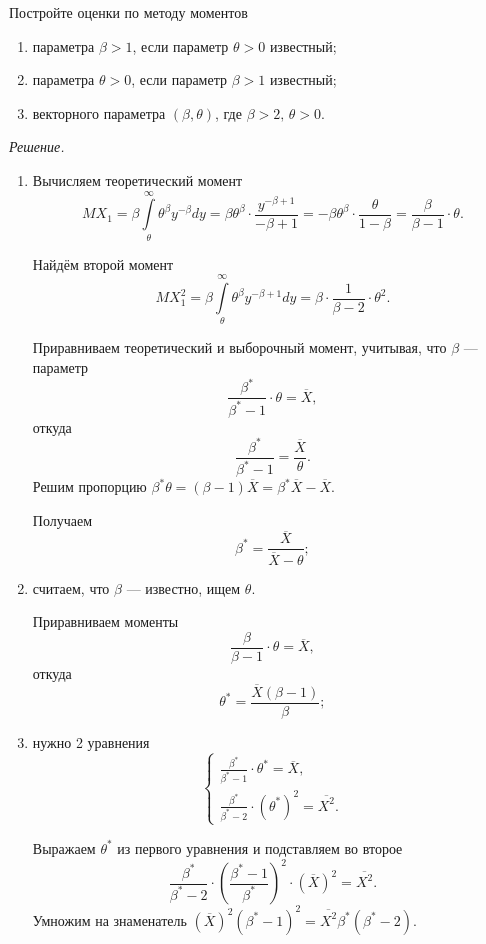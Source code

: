 Постройте оценки по методу моментов
\begin{enumerate}[label=\alph*)]
  \item параметра $ \beta > 1$, если параметр $ \theta > 0$ известный;
  \item параметра $ \theta > 0$, если параметр $ \beta > 1$ известный;
  \item векторного параметра $ \left( \beta, \theta \right) $, где $ \beta > 2, \, \theta > 0$.
\end{enumerate}

\textit{Решение.}
\begin{enumerate}[label=\alph*)]
  \item Вычисляем теоретический момент
  $$MX_1 =
    \beta \int \limits_{ \theta }^{ \infty } \theta^{ \beta } y^{- \beta } dy =
    \beta \theta^{ \beta } \cdot \frac{y^{- \beta + 1}}{- \beta + 1} =
    - \beta \theta^{ \beta } \cdot \frac{ \theta }{1 - \beta } =
    \frac{ \beta }{ \beta - 1} \cdot \theta.$$

  Найдём второй момент
  $$MX_1^2 =
    \beta \int \limits_{ \theta }^{ \infty } \theta^{ \beta } y^{- \beta + 1} dy =
    \beta \cdot \frac{1}{ \beta - 2} \cdot \theta^2.$$

  Приравниваем теоретический и выборочный момент, учитывая, что $ \beta $ --- параметр
  $$ \frac{ \beta^*}{ \beta^* - 1} \cdot \theta =
    \overline{X},$$
  откуда
  $$ \frac{ \beta^*}{ \beta^* - 1} =
    \frac{ \overline{X}}{ \theta }.$$
  Решим пропорцию
  $ \beta^* \theta =
    \left( \beta - 1 \right) \overline{X} =
    \beta^* \overline{X} - \overline{X}$.

  Получаем
  $$ \beta^* =
    \frac{ \overline{X}}{ \overline{X} - \theta };$$
  \item считаем, что $ \beta $ --- известно, ищем $ \theta $.

  Приравниваем моменты
  $$ \frac{ \beta }{ \beta - 1} \cdot \theta =
    \overline{X},$$
  откуда
  $$ \theta^* =
    \frac{ \overline{X} \left( \beta - 1 \right) }{ \beta };$$
  \item нужно 2 уравнения
  $$ \begin{cases}
      \frac{ \beta^*}{ \beta^* - 1} \cdot \theta^* = \overline{X}, \\
      \frac{ \beta^*}{ \beta^* - 2} \cdot \left( \theta^* \right)^2 = \overline{X^2}.
    \end{cases}$$

  Выражаем $ \theta^*$ из первого уравнения и подставляем во второе
  $$ \frac{ \beta^*}{ \beta^* - 2} \cdot
    \left( \frac{ \beta^* - 1}{ \beta^*} \right)^2 \cdot
    \left( \overline{X} \right)^2 =
    \overline{X^2}.$$
  Умножим на знаменатель
  $ \left( \overline{X} \right)^2 \left( \beta^* - 1 \right)^2 =
    \overline{X^2} \beta^* \left( \beta^* - 2 \right) $.


\end{enumerate}
